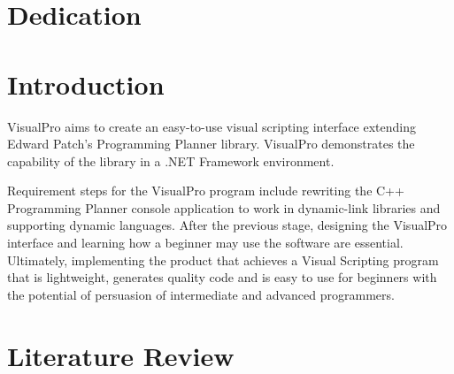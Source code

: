 \documentclass[12pt]{report} %
\begin{document}
\chapter*{Dedication}

\setcounter{page}{5}
	
	\vfill
	
	\newpage %
	\thispagestyle{empty}
	\mbox{}
	


\tableofcontents
\thispagestyle{fancy}

\newpage %
\thispagestyle{empty}
\mbox{}

\listoffigures
\thispagestyle{fancy}

\newpage %
\thispagestyle{empty}
\mbox{}

\listoftables
\thispagestyle{fancy}

\newpage %
\thispagestyle{empty}
\mbox{}


\clearpage
{} %

\chapter{Introduction}
	VisualPro aims to create an easy-to-use visual scripting interface extending Edward Patch's Programming Planner library. VisualPro demonstrates the capability of the library in a .NET Framework environment. 

	Requirement steps for the VisualPro program include rewriting the C++ Programming Planner console application to work in dynamic-link libraries and supporting dynamic languages. After the previous stage, designing the VisualPro interface and learning how a beginner may use the software are essential. Ultimately, implementing the product that achieves a Visual Scripting program that is lightweight, generates quality code and is easy to use for beginners with the potential of persuasion of intermediate and advanced programmers.
	
\chapter{Literature Review}
\label{sec:literatureReview}
\end{document}
